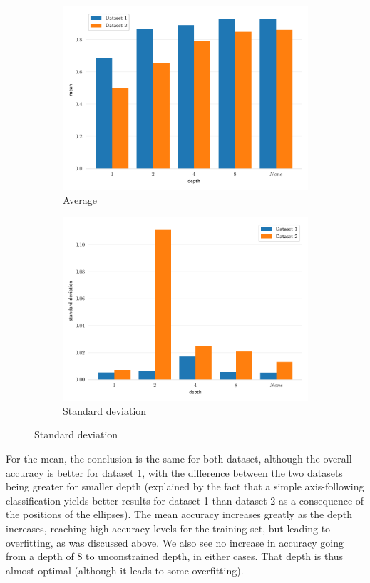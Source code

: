 \begin{figure}[H]
    \centering
    \begin{subfigure}{0.495\textwidth}
        \includegraphics[width=\textwidth]{resources/pdf/dt_accuracies_mean.pdf}
        \caption{Average}
    \end{subfigure}
    \begin{subfigure}{0.495\textwidth}
        \includegraphics[width=\textwidth]{resources/pdf/dt_accuracies_std.pdf}
        \caption{Standard deviation}
    \end{subfigure}
    \label{fig:dt_accuracy}
\end{figure}
For the mean, the conclusion is the same for both dataset, although the overall accuracy is better for dataset 1, with the difference between the two datasets being greater for smaller depth (explained by the fact that a simple \og{}axis-following\fg{} classification yields better results for dataset 1 than dataset 2 as a consequence of the positions of the ellipses). The mean accuracy increases greatly as the depth increases, reaching high accuracy levels for the training set, but leading to overfitting, as was discussed above. We also see no increase in accuracy going from a depth of 8 to unconstrained depth, in either cases. That depth is thus almost optimal (although it leads to some overfitting).\par
